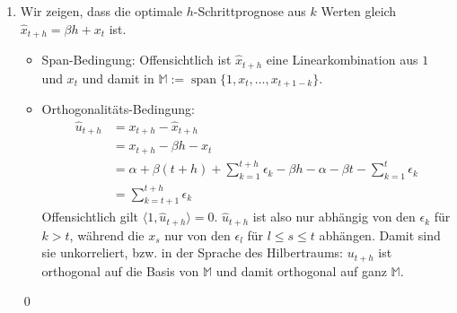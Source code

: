 \documentclass[a4paper,11pt,notitlepage,fullpage]{article}
\DeclareMathOperator*{\spann}{span}
\begin{document}
\begin{enumerate}
\begin{enumerate}
\item Wir zeigen, dass die optimale $h$-Schrittprognose aus $k$ Werten gleich $\hat x_{t+h} = \beta h + x_t$ ist.
\begin{itemize}
\item Span-Bedingung: Offensichtlich ist $\hat x_{t+h}$ eine Linearkombination aus $1$ und $x_t$ und damit in $\mathbb M := \spann\{1, x_t, \hdots, x_{t+1-k}\}$.
\item Orthogonalitäts-Bedingung: 
\begin{align*}
\hat u_{t+h} &= x_{t+h} - \hat x_{t+h} \\
&= x_{t+h} - \beta h - x_t \\
&= \alpha + \beta (t+h) + \sum_{k=1}^{t+h}  \epsilon_k - \beta h - \alpha - \beta t - \sum_{k=1}^t \epsilon_k \\
&= \sum_{k=t+1}^{t+h} \epsilon_k
\end{align*}
Offensichtlich gilt $\langle 1, \hat u_{t+h} \rangle = 0$. $\hat u_{t+h}$ ist also nur abhängig von den $\epsilon_k$ für $k > t$, während die $x_s$ nur von den $\epsilon_l$ für $l \leq s \leq t$ abhängen. Damit sind sie unkorreliert, bzw. in der Sprache des Hilbertraums: $u_{t+h}$ ist orthogonal auf die Basis von $\mathbb M$ und damit orthogonal auf ganz $\mathbb M$.
\end{itemize}
\qed
\end{enumerate}



\end{enumerate}
\end{document}
